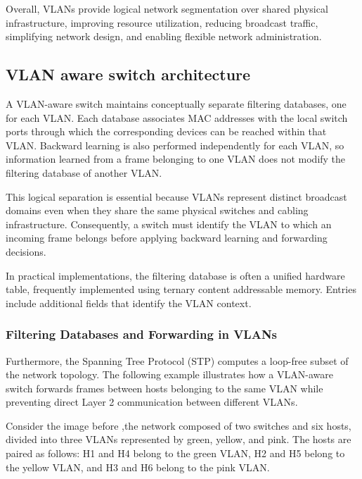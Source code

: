 Overall, VLANs provide logical network segmentation over shared physical infrastructure, improving resource utilization, reducing broadcast traffic, simplifying network design, and enabling flexible network administration.

\subsection{VLAN aware switch architecture}

A VLAN-aware switch maintains conceptually separate filtering databases, one for each VLAN. Each database associates MAC addresses with the local switch ports through which the corresponding devices can be reached within that VLAN. Backward learning is also performed independently for each VLAN, so information learned from a frame belonging to one VLAN does not modify the filtering database of another VLAN.

This logical separation is essential because VLANs represent distinct broadcast domains even when they share the same physical switches and cabling infrastructure. Consequently, a switch must identify the VLAN to which an incoming frame belongs before applying backward learning and forwarding decisions.
\begin{center}
\end{center}

In practical implementations, the filtering database is often a unified hardware table, frequently implemented using ternary content addressable memory. Entries include additional fields that identify the VLAN context.

\subsubsection{Filtering Databases and Forwarding in VLANs} 

Furthermore, the Spanning Tree Protocol (STP) computes a loop-free subset of the network topology. The following example illustrates how a VLAN-aware switch forwards frames between hosts belonging to the same VLAN while preventing direct Layer 2 communication between different VLANs.

\begin{center}
\end{center}

Consider the image before ,the network composed of two switches and six hosts, divided into three VLANs represented by green, yellow, and pink. The hosts are paired as follows: H1 and H4 belong to the green VLAN, H2 and H5 belong to the yellow VLAN, and H3 and H6 belong to the pink VLAN.

